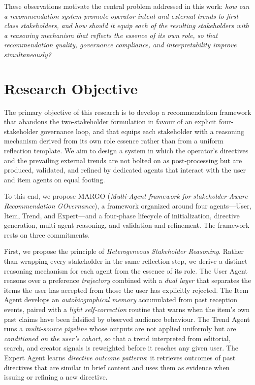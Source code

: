 \documentclass[master,english,final]{postech-ucs}
\begin{document}
These observations motivate the central problem addressed in this work: \emph{how can a recommendation system promote operator intent and external trends to first-class stakeholders, and how should it equip each of the resulting stakeholders with a reasoning mechanism that reflects the essence of its own role, so that recommendation quality, governance compliance, and interpretability improve simultaneously?}


\section{Research Objective}

The primary objective of this research is to develop a recommendation framework that abandons the two-stakeholder formulation in favour of an explicit four-stakeholder governance loop, and that equips each stakeholder with a reasoning mechanism derived from its own role essence rather than from a uniform reflection template.
We aim to design a system in which the operator's directives and the prevailing external trends are not bolted on as post-processing but are produced, validated, and refined by dedicated agents that interact with the user and item agents on equal footing.

To this end, we propose MARGO (\emph{Multi-Agent framework for stakeholder-Aware Recommendation GOvernance}), a framework organized around four agents---User, Item, Trend, and Expert---and a four-phase lifecycle of initialization, directive generation, multi-agent reasoning, and validation-and-refinement.
The framework rests on three commitments.

First, we propose the principle of \emph{Heterogeneous Stakeholder Reasoning}.
Rather than wrapping every stakeholder in the same reflection step, we derive a distinct reasoning mechanism for each agent from the essence of its role.
The User Agent reasons over a preference \emph{trajectory} combined with a \emph{dual layer} that separates the items the user has accepted from those the user has explicitly rejected.
The Item Agent develops an \emph{autobiographical memory} accumulated from past reception events, paired with a \emph{light self-correction} routine that warns when the item's own past claims have been falsified by observed audience behaviour.
The Trend Agent runs a \emph{multi-source pipeline} whose outputs are not applied uniformly but are \emph{conditioned on the user's cohort}, so that a trend interpreted from editorial, search, and creator signals is reweighted before it reaches any given user.
The Expert Agent learns \emph{directive outcome patterns}: it retrieves outcomes of past directives that are similar in brief content and uses them as evidence when issuing or refining a new directive.
\end{document}
